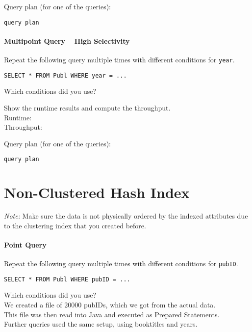 \documentclass[11pt]{scrartcl}
\begin{document}
\smallskip\noindent
Query plan (for one of the queries):
{\small
\begin{verbatim}
query plan
\end{verbatim}
}


\paragraph{Multipoint Query -- High Selectivity}

Repeat the following query multiple times with different conditions for {\tt year}.

{\small
\begin{verbatim}
SELECT * FROM Publ WHERE year = ...
\end{verbatim}
}

\noindent
Which conditions did you use?

\smallskip\noindent
Show the runtime results and compute the throughput.\\
Runtime: \\
Throughput: 

\smallskip\noindent
Query plan (for one of the queries):
{\small
\begin{verbatim}
query plan
\end{verbatim}
}

\section{Non-Clustered Hash Index}

\noindent \emph{Note:} Make sure the data is not physically ordered by
the indexed attributes due to the clustering index that you created
before.

\paragraph{Point Query}

Repeat the following query multiple times with different conditions for {\tt pubID}.

{\small
\begin{verbatim}
SELECT * FROM Publ WHERE pubID = ...
\end{verbatim}
}

\noindent
Which conditions did you use?\\
We created a file of 20000 pubIDs, which we got from the actual data.\\
This file was then read into Java and executed as Prepared Statements.\\
Further queries used the same setup, using booktitles and years.
\end{document}
